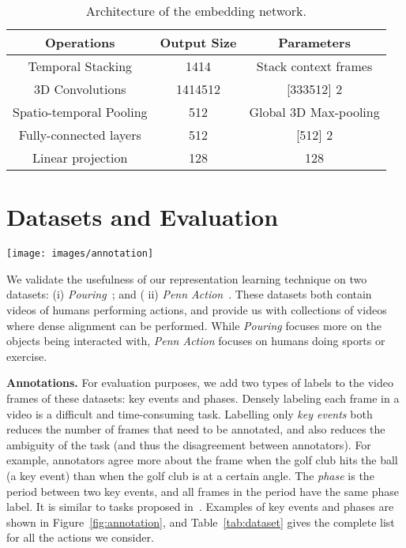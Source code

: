 \documentclass[10pt,twocolumn,letterpaper]{article}
\begin{document}
\begin{table}[]
\centering
\footnotesize{
\begin{tabular}{c|c|c}
\hline
Operations                  & Output Size              & Parameters\\
\hline
\hline
Temporal Stacking      & 1414        & Stack  context frames \\ 
3D Convolutions &  1414512 & [333512]  2\\
Spatio-temporal Pooling & 512 & Global 3D Max-pooling \\
Fully-connected layers & 512& [512]  2\\
Linear projection      & 128                        & 128                                                                                    \\ \hline
\end{tabular}
\caption{Architecture of the embedding network.}
\label{tab:small_architecture}
\vspace{-3.5em}
}
\end{table}
 \section{Datasets and Evaluation}

\begin{figure*}[!t]
\centering
\texttt{[image: images/annotation]}
\caption{Example labels for the actions `Baseball Pitch' (top row) and `Pouring' (bottom row). 
The key events are shown in boxes below the frame (e.g.\ `Hand touches bottle'), 
and each frame in between two key events has a phase label (e.g.\ `Lifting bottle').}
\label{fig:annotation}
\end{figure*}

We validate the usefulness of our representation learning technique on
two datasets: (i) \textit{Pouring}~\cite{Sermanet2017TCN}; and ( ii)
\textit{Penn Action}~\cite{zhang2013actemes}. These datasets both contain
videos of humans performing actions, 
and provide us with collections of videos where dense alignment can be
performed. 
While \textit{Pouring} focuses
more on the objects being interacted with, \textit{Penn Action}
focuses on humans doing sports or exercise. 

\noindent\textbf{Annotations.} For evaluation purposes, we add two types of labels to the video frames of 
these datasets: key events and phases. 
Densely labeling each frame in a video is a difficult and
time-consuming task. Labelling only {\em key events} both reduces the number of frames
that need to be annotated, and also reduces 
the ambiguity of the task (and thus the
disagreement between annotators). For example, annotators agree more
about the frame when the golf club hits the ball (a key event) than when  the
golf club is at a certain angle. The {\em phase} is the period between two key events, and all frames in the
period have the same phase label. It is similar to tasks proposed in~\cite{kuehne2014language,bojanowski2014weakly,damen2018scaling}. Examples of key events and phases are shown in 
Figure~\ref{fig:annotation}, 
and Table~\ref{tab:dataset} gives the complete list for all the actions we consider.
\end{document}
